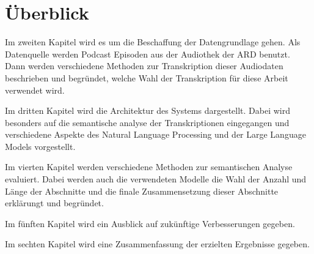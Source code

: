 \section{Überblick}

Im zweiten Kapitel wird es um die Beschaffung der Datengrundlage gehen. Als Datenquelle werden Podcast Episoden aus der Audiothek der ARD benutzt. 
Dann werden verschiedene Methoden zur Transkription dieser Audiodaten beschrieben und begründet, welche Wahl der Transkription für diese Arbeit verwendet wird.

Im dritten Kapitel wird die Architektur des Systems dargestellt. 
Dabei wird besonders auf die semantische analyse der Transkriptionen eingegangen und verschiedene Aspekte des Natural Language Processing und der Large Language Models vorgestellt.

Im vierten Kapitel werden verschiedene Methoden zur semantischen Analyse evaluiert.
Dabei werden auch die verwendeten Modelle die Wahl der Anzahl und Länge der Abschnitte und die finale Zusammensetzung dieser Abschnitte erklärungt und begründet.

Im fünften Kapitel wird ein Ausblick auf zukünftige Verbesserungen gegeben.

Im sechten Kapitel wird eine Zusammenfassung der erzielten Ergebnisse gegeben.
